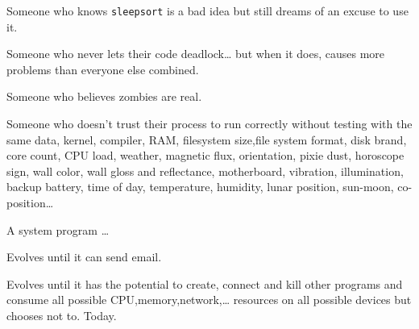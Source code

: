 Someone who knows \texttt{sleepsort} is a bad idea but still dreams of an excuse to use it.

Someone who never lets their code deadlock\ldots{} but when it does, causes more problems than everyone else combined.

Someone who believes zombies are real.

Someone who doesn't trust their process to run correctly without testing with the same data, kernel, compiler, RAM, filesystem size,file system format, disk brand, core count, CPU load, weather, magnetic flux, orientation, pixie dust, horoscope sign, wall color, wall gloss and reflectance, motherboard, vibration, illumination, backup battery, time of day, temperature, humidity, lunar position, sun-moon, co-position\ldots{}

A system program \ldots{}

Evolves until it can send email.

Evolves until it has the potential to create, connect and kill other programs and consume all possible CPU,memory,network,\ldots{} resources on all possible devices but chooses not to. Today.
